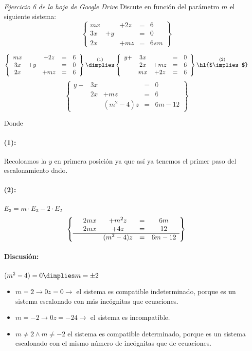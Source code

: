 \documentclass[palatino,nosec,nochap]{Docencia}
\newcommand{\cimplies}{\text{\hl{$\implies$}}}
\begin{document}
\begin{problem} \textit{Ejercicio 6 de la hoja de Google Drive}
Discute en función del parámetro $m$ el siguiente sistema:
\[
\left\{
\begin{array}{ccccc}
mx&&+2z&=&6\\
3x&+y&&=&0\\
2x&&+mz&=&6sm
\end{array}
\right\}
\]

\solution

\[
\left\{
\begin{array}{ccccc}
mx&&+2z&=&6\\
3x&+y&&=&0\\
2x&&+mz&=&6\\
\end{array}
\right\}
\overset{(1)}{\dimplies}
\left\{
\begin{array}{ccccc}
y+&3x&&=&0\\
&2x&+mz&=&6\\
&mx&+2z&=&6\\
\end{array}
\right\}
\overset{(2)}{\cimplies}
\]
\[
\left\{
\begin{array}{ccccl}
y+&3x&&=&0\\
&2x&+mz&=&6\\
&&(m^2-4)z&=&6m-12
\end{array}
\right\}
\]

Donde
\paragraph{(1):} Recoloamos la $y$ en primera posición ya que así ya tenemos el primer paso del escalonamiento dado.

\paragraph{(2):} $E_3 = m·E_3-2·E_2$
\[
\left\{
\begin{array}{ccccc}
	&2mx&+m^2z&=&6m\\
	&2mx&+4z&=&12\\\hline
	&&(m^2-4)z&=&6m-12
\end{array}
\right\}
\]

\paragraph{Discusión:} $(m^2-4)=0 \dimplies m=\pm2$

\begin{itemize}
	\item $m=2 \to 0z=0 \to $ el sistema es compatible indeterminado, porque es un sistema escalonado con más incógnitas que ecuaciones.
	\item $m=-2 \to 0z=-24 \to$ el sistema es incompatible.
	\item $m≠2\wedge m≠-2$ el sistema es compatible determinado, porque es un sistema escalonado con el mismo número de incógnitas que de ecuaciones.
\end{itemize}


\end{problem}
\end{document}
